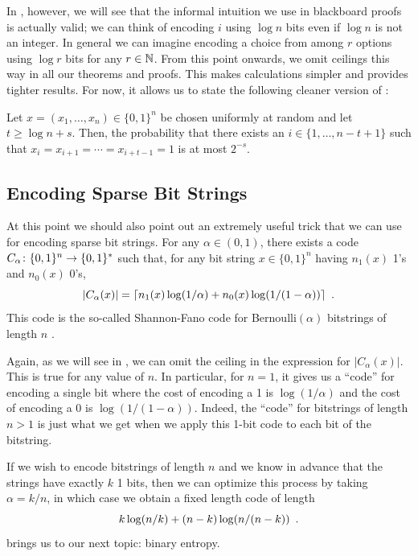 \documentclass{patmorin}
\newenvironment{customthm}[1]
  {\renewcommand\theinnercustomthm{#1}\innercustomthm}
  {\endinnercustomthm}
\begin{document}
In , however, we will see that the informal intuition
we use in blackboard proofs is actually valid; we can think of
encoding $i$ using $\log n$ bits even if $\log n$ is not an integer.
In general we can imagine encoding a choice from among $r$ options
using $\log r$ bits for any $r\in\mathbb{N}$.  From this point onwards, we
omit ceilings this way in all our theorems and proofs. This makes
calculations simpler and provides tighter results.  For now, it allows
us to state the following cleaner version of :

\begin{customthm}{\ref{thm:runs-i}b}
  Let $x=(x_1,\ldots,x_n)\in\{0,1\}^n$ be chosen uniformly at random
  and let $t \ge \log n + s$. Then, the probability that there exists
  an $i\in\{1,\ldots,n-t+1\}$ such that
  $x_i=x_{i+1}=\cdots=x_{i+t-1}=1$ is at most $2^{-s}$.
\end{customthm}

\subsection{Encoding Sparse Bit Strings}

At this point we should also point out an extremely useful trick that
we can use for encoding sparse bit strings. For any $\alpha\in(0,1)$,
there exists a code $C_\alpha\colon \{0,1\}^n\rightarrow \{0,1\}^*$
such that, for any bit string $x\in\{0,1\}^n$ having $n_1(x)$ 1's and
$n_0(x)$ 0's,
\begin{equation}
  |C_\alpha(x)| = \lceil n_1(x)\log(1/\alpha) + n_0(x)\log(1/(1-\alpha)) \rceil \enspace .
  \eqlabel{sparse-bitstring-i}
\end{equation}
This code is the so-called Shannon-Fano code for Bernoulli$(\alpha)$
bitstrings of length $n$
\cite{fano:transmission,shannon:mathematical}.

Again, as we will see in , we can omit the ceiling in
the expression for $|C_\alpha(x)|$.  This is true for any value of
$n$. In particular, for $n=1$, it gives us a ``code'' for encoding a
single bit where the cost of encoding a 1 is $\log(1/\alpha)$ and the
cost of encoding a 0 is $\log(1/(1-\alpha))$.  Indeed, the ``code''
for bitstrings of length $n>1$ is just what we get when we apply this
1-bit code to each bit of the bitstring.

If we wish to encode bitstrings of length $n$ and we know in advance
that the strings have exactly $k$ 1 bits, then we can optimize this
process by taking $\alpha=k/n$, in which case we obtain a fixed length
code of length
\begin{equation}
    k\log (n/k) + (n-k)\log(n/(n-k))  \eqlabel{sparse-bitstring-ii} \enspace .
\end{equation}
 brings us to our next topic: binary entropy.
\end{document}
